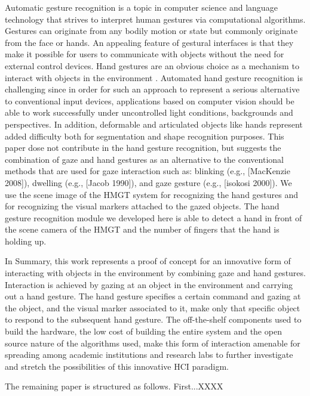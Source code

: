 \documentclass[jou,a4paper,notxfonts]{apa}
\begin{document}
 Automatic gesture recognition is a topic in computer science and language technology that strives to interpret human gestures via computational algorithms. Gestures can originate from any bodily motion or state but commonly originate from the face or hands. An appealing feature of gestural interfaces is that they make it possible for users to communicate with objects without the need for external control devices. Hand gestures are an obvious choice as a mechanism to interact with objects in the environment \cite{Rozado2012b,myicann2010}. Automated hand gesture recognition is challenging since in order for such an approach to represent a serious alternative to conventional input devices, applications based on computer vision should be able to work successfully under uncontrolled light conditions, backgrounds and perspectives. In addition, deformable and articulated objects like hands represent added difficulty both for segmentation and shape recognition purposes. This paper dose not contribute in the hand gesture recognition, but suggests the combination of gaze and hand gestures as an alternative to the conventional methods that are used for gaze interaction such as: blinking (e.g., [MacKenzie 2008]), dwelling (e.g., [Jacob 1990]), and gaze gesture (e.g., [isokosi 2000]). We use the scene image of the HMGT system for recognizing the hand gestures and for recognizing the visual markers attached to the gazed objects. The hand gesture recognition module we developed here is able to detect a hand in front of the scene camera of the HMGT and the number of fingers that the hand is holding up. 
 
 In Summary, this work represents a proof of concept for an innovative form of interacting with objects in the environment by combining gaze and hand gestures. Interaction is achieved by gazing at an object in the environment and carrying out a hand gesture. The hand gesture specifies a certain command and gazing at the object, and the visual marker associated to it, make only that specific object to respond to the subsequent hand gesture. The off-the-shelf components used to build the hardware, the low cost of building the entire system and the open source nature of the algorithms used, make this form of interaction amenable for spreading among academic institutions and research labs to further investigate and stretch the possibilities of this innovative HCI paradigm.

The remaining paper is structured as follows. First...XXXX
\end{document}
